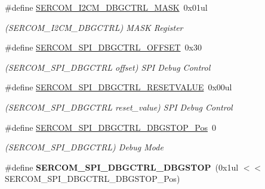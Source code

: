 \begin{DoxyCompactItemize}
\item 
\hypertarget{group___s_a_m_l21___s_e_r_c_o_m_ga81ace5c1c4c23377532cac6c5e94b833}{}\#define \hyperlink{group___s_a_m_l21___s_e_r_c_o_m_ga81ace5c1c4c23377532cac6c5e94b833}{S\+E\+R\+C\+O\+M\+\_\+\+I2\+C\+M\+\_\+\+D\+B\+G\+C\+T\+R\+L\+\_\+\+M\+A\+S\+K}~0x01ul\label{group___s_a_m_l21___s_e_r_c_o_m_ga81ace5c1c4c23377532cac6c5e94b833}

\begin{DoxyCompactList}\small\item\em (S\+E\+R\+C\+O\+M\+\_\+\+I2\+C\+M\+\_\+\+D\+B\+G\+C\+T\+R\+L) M\+A\+S\+K Register \end{DoxyCompactList}\item 
\hypertarget{group___s_a_m_l21___s_e_r_c_o_m_ga774d1d0335e260011568c4dfad9ca8fb}{}\#define \hyperlink{group___s_a_m_l21___s_e_r_c_o_m_ga774d1d0335e260011568c4dfad9ca8fb}{S\+E\+R\+C\+O\+M\+\_\+\+S\+P\+I\+\_\+\+D\+B\+G\+C\+T\+R\+L\+\_\+\+O\+F\+F\+S\+E\+T}~0x30\label{group___s_a_m_l21___s_e_r_c_o_m_ga774d1d0335e260011568c4dfad9ca8fb}

\begin{DoxyCompactList}\small\item\em (S\+E\+R\+C\+O\+M\+\_\+\+S\+P\+I\+\_\+\+D\+B\+G\+C\+T\+R\+L offset) S\+P\+I Debug Control \end{DoxyCompactList}\item 
\hypertarget{group___s_a_m_l21___s_e_r_c_o_m_ga8828fb3bbae793780cde1a051e394d32}{}\#define \hyperlink{group___s_a_m_l21___s_e_r_c_o_m_ga8828fb3bbae793780cde1a051e394d32}{S\+E\+R\+C\+O\+M\+\_\+\+S\+P\+I\+\_\+\+D\+B\+G\+C\+T\+R\+L\+\_\+\+R\+E\+S\+E\+T\+V\+A\+L\+U\+E}~0x00ul\label{group___s_a_m_l21___s_e_r_c_o_m_ga8828fb3bbae793780cde1a051e394d32}

\begin{DoxyCompactList}\small\item\em (S\+E\+R\+C\+O\+M\+\_\+\+S\+P\+I\+\_\+\+D\+B\+G\+C\+T\+R\+L reset\+\_\+value) S\+P\+I Debug Control \end{DoxyCompactList}\item 
\hypertarget{group___s_a_m_l21___s_e_r_c_o_m_ga39365bc8f796fccdba95cf8a2b06b63e}{}\#define \hyperlink{group___s_a_m_l21___s_e_r_c_o_m_ga39365bc8f796fccdba95cf8a2b06b63e}{S\+E\+R\+C\+O\+M\+\_\+\+S\+P\+I\+\_\+\+D\+B\+G\+C\+T\+R\+L\+\_\+\+D\+B\+G\+S\+T\+O\+P\+\_\+\+Pos}~0\label{group___s_a_m_l21___s_e_r_c_o_m_ga39365bc8f796fccdba95cf8a2b06b63e}

\begin{DoxyCompactList}\small\item\em (S\+E\+R\+C\+O\+M\+\_\+\+S\+P\+I\+\_\+\+D\+B\+G\+C\+T\+R\+L) Debug Mode \end{DoxyCompactList}\item 
\hypertarget{group___s_a_m_l21___s_e_r_c_o_m_gaca1ceb05abe241f977e5d7be2acca877}{}\#define {\bfseries S\+E\+R\+C\+O\+M\+\_\+\+S\+P\+I\+\_\+\+D\+B\+G\+C\+T\+R\+L\+\_\+\+D\+B\+G\+S\+T\+O\+P}~(0x1ul $<$$<$ S\+E\+R\+C\+O\+M\+\_\+\+S\+P\+I\+\_\+\+D\+B\+G\+C\+T\+R\+L\+\_\+\+D\+B\+G\+S\+T\+O\+P\+\_\+\+Pos)\label{group___s_a_m_l21___s_e_r_c_o_m_gaca1ceb05abe241f977e5d7be2acca877}


\end{DoxyCompactItemize}
